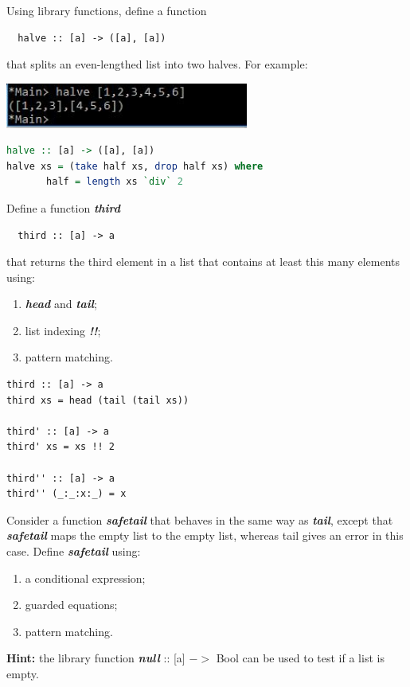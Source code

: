 \documentclass{article}
\begin{document}
\begin{Exercise} 
Using library functions, define a function \\
\begin{lstlisting}
  halve :: [a] -> ([a], [a])
\end{lstlisting}
that splits an even-lengthed list into two halves. For example: 
\begin{center}
	\includegraphics[width=8cm]{img/01.jpg}
\end{center}
\end{Exercise}
\begin{Answer}
\begin{lstlisting}[language=Haskell]
halve :: [a] -> ([a], [a]) 
halve xs = (take half xs, drop half xs) where 
       half = length xs `div` 2
\end{lstlisting}
\end{Answer}
\begin{Exercise} 

Define a function \textbf{\textit{third}}\\
\begin{lstlisting}
  third :: [a] -> a
\end{lstlisting}
that returns the third element in a list that contains at least this many elements using:
\begin{enumerate}
	\item \textbf{\textit{head}} and \textbf{\textit{tail}};
	\item list indexing \textbf{\textit{!!}};
	\item pattern matching.
\end{enumerate}
\end{Exercise}
\begin{Answer}
\begin{lstlisting}
third :: [a] -> a
third xs = head (tail (tail xs)) 

third' :: [a] -> a
third' xs = xs !! 2

third'' :: [a] -> a
third'' (_:_:x:_) = x
\end{lstlisting}
\end{Answer}
\begin{Exercise} 

Consider a function \textbf{\textit{safetail}} that behaves in the same way as \textbf{\textit{tail}}, except that \textbf{\textit{safetail}} maps the empty list to the empty list, whereas tail gives an error in this case.  Define \textbf{\textit{safetail}} using:
\begin{enumerate}
	\item a conditional expression;
	\item guarded equations;
	\item pattern matching.
\end{enumerate}
\textbf{Hint:}  the library function \textbf{\textit{null}} :: [a] $->$ Bool can be used to test if a list is empty.
\end{Exercise}
\end{document}
